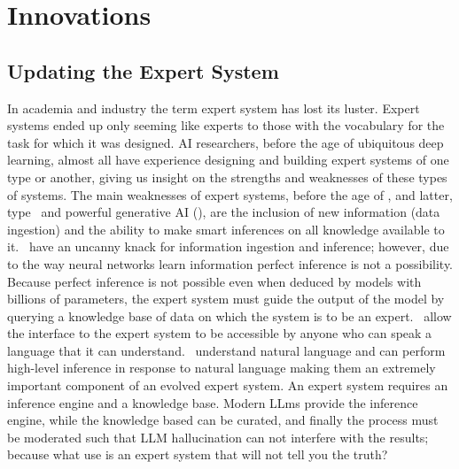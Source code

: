 \section{Innovations}

\subsection{Updating the Expert System}
In academia and industry the term expert system has lost its luster.
Expert systems ended up only seeming like experts to those with the vocabulary for the task for which it was designed.
AI researchers, before the age of ubiquitous deep learning, almost all have experience designing and building expert systems of one type or another, giving us insight on the strengths and weaknesses of these types of systems.
The main weaknesses of expert systems, before the age of \gpts, and latter, type \llms\  and powerful generative AI (\gai), are the inclusion of new information (data ingestion) and the ability to make smart inferences on all knowledge available to it.
\llms\ have an uncanny knack for information ingestion and inference; however, due to the way neural networks learn information perfect inference is not a possibility.
Because perfect inference is not possible even when deduced by models with billions of parameters, the expert system must guide the output of the model by querying a knowledge base of data on which the system is to be an expert.
\llms\ allow the interface to the expert system to be accessible by anyone who can speak a language that it can understand.
\llms\ understand natural language and can perform high-level inference in response to natural language making them an extremely important component of an evolved expert system.
An expert system requires an inference engine and a knowledge base.
Modern LLms provide the inference engine, while the knowledge based can be curated, and finally the process must be moderated such that LLM hallucination can not interfere with the results; because what use is an expert system that will not tell you the truth?

